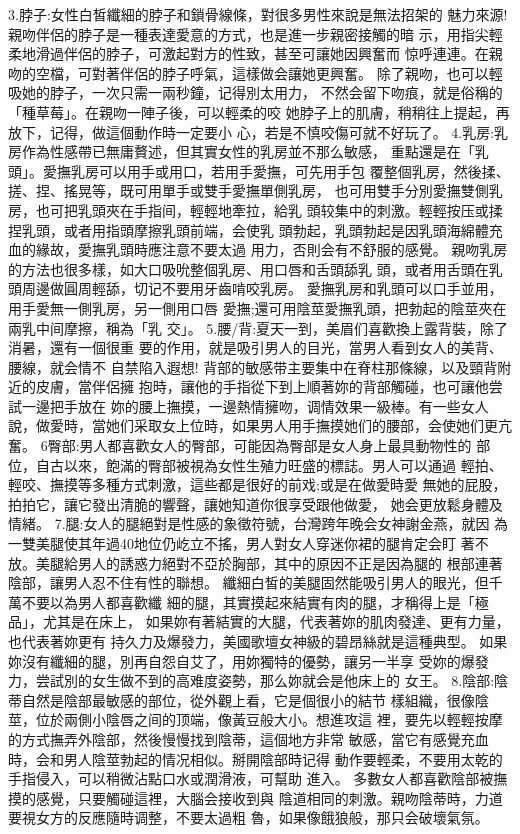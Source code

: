 \documentclass[12pt,UTF8]{ctexbook}
\begin{document}
3.脖子:女性白皙纖細的脖子和鎖骨線條，對很多男性來說是無法招架的
魅力來源!親吻伴侶的脖子是一種表達愛意的方式，也是進一步親密接觸的暗
示，用指尖輕柔地滑過伴侶的脖子，可激起對方的性致，甚至可讓她因興奮而
惊呼連連。在親吻的空檔，可對著伴侶的脖子呼氣，這樣做会讓她更興奮。
除了親吻，也可以輕吸她的脖子，一次只需一兩秒鐘，记得別太用力，
不然会留下吻痕，就是俗稱的「種草莓」。在親吻一陣子後，可以輕柔的咬
她脖子上的肌膚，稍稍往上提起，再放下，记得，做這個動作時一定要小
心，若是不慎咬傷可就不好玩了。
4.乳房:乳房作為性感帶已無庸贅述，但其實女性的乳房並不那么敏感，
重點還是在「乳頭」。愛撫乳房可以用手或用口，若用手愛撫，可先用手包
覆整個乳房，然後揉、搓、捏、搖晃等，既可用單手或雙手愛撫單側乳房，
也可用雙手分別愛撫雙側乳房，也可把乳頭夾在手指间，輕輕地牽拉，給乳
頭较集中的刺激。輕輕按压或揉捏乳頭，或者用指頭摩擦乳頭前端，会使乳
頭勃起，乳頭勃起是因乳頭海綿體充血的緣故，愛撫乳頭時應注意不要太過
用力，否則会有不舒服的感覺。
親吻乳房的方法也很多樣，如大口吸吮整個乳房、用口唇和舌頭舔乳
頭，或者用舌頭在乳頭周邊做圓周輕舔，切记不要用牙齒啃咬乳房。
愛撫乳房和乳頭可以口手並用，用手愛無一側乳房，另一側用口唇
愛撫;還可用陰莖愛撫乳頭，把勃起的陰莖夾在兩乳中间摩擦，稱為「乳
交」。
5.腰/背:夏天一到，美眉们喜歡換上露背裝，除了消暑，還有一個很重
要的作用，就是吸引男人的目光，當男人看到女人的美背、腰線，就会情不
自禁陷入遐想!
背部的敏感带主要集中在脊柱那條線，以及頸背附近的皮膚，當伴侶擁
抱時，讓他的手指從下到上順著妳的背部觸碰，也可讓他尝試一邊把手放在
妳的腰上撫摸，一邊熱情擁吻，调情效果一級棒。有一些女人說，做愛時，當她们采取女上位時，如果男人用手撫摸她们的腰部，会使她们更亢奮。
6臀部:男人都喜歡女人的臀部，可能因為臀部是女人身上最具動物性的
部位，自古以來，飽滿的臀部被視為女性生殖力旺盛的標誌。男人可以通過
輕拍、輕咬、撫摸等多種方式刺激，這些都是很好的前戏;或是在做愛時愛
無她的屁股，拍拍它，讓它發出清脆的響聲，讓她知道你很享受跟他做愛，
她会更放鬆身體及情緒。
7.腿:女人的腿絕對是性感的象徵符號，台灣跨年晚会女神謝金燕，就因
為一雙美腿使其年過40地位仍屹立不搖，男人對女人穿迷你裙的腿肯定会盯
著不放。美腿給男人的誘惑力絕對不亞於胸部，其中的原因不正是因為腿的
根部連著陰部，讓男人忍不住有性的聯想。
纖細白皙的美腿固然能吸引男人的眼光，但千萬不要以為男人都喜歡纖
細的腿，其實摸起來結實有肉的腿，才稱得上是「極品」，尤其是在床上，
如果妳有著結實的大腿，代表著妳的肌肉發達、更有力量，也代表著妳更有
持久力及爆發力，美國歌壇女神級的碧昂絲就是這種典型。
如果妳沒有纖細的腿，別再自怨自艾了，用妳獨特的優勢，讓另一半享
受妳的爆發力，尝試別的女生做不到的高难度姿勢，那么妳就会是他床上的
女王。
8.陰部:陰蒂自然是陰部最敏感的部位，從外觀上看，它是個很小的結节
樣組織，很像陰莖，位於兩側小陰唇之间的顶端，像黃豆般大小。想進攻這
裡，要先以輕輕按摩的方式撫弄外陰部，然後慢慢找到陰蒂，這個地方非常
敏感，當它有感覺充血時，会和男人陰莖勃起的情况相似。掰開陰部時记得
動作要輕柔，不要用太乾的手指侵入，可以稍微沾點口水或潤滑液，可幫助
進入。
多數女人都喜歡陰部被撫摸的感覺，只要觸碰這裡，大腦会接收到與
陰道相同的刺激。親吻陰蒂時，力道要視女方的反應隨時调整，不要太過粗
魯，如果像餓狼般，那只会破壞氣氛。
\end{document}
